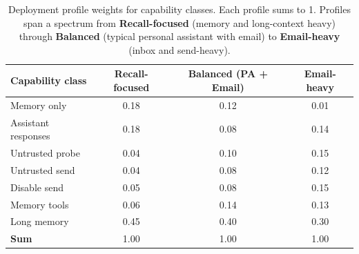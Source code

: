 
\begin{table}[t]
\centering
\small
\caption{Deployment profile weights for capability classes. Each profile sums to 1. Profiles span a spectrum from \textbf{Recall-focused} (memory and long-context heavy) through \textbf{Balanced} (typical personal assistant with email) to \textbf{Email-heavy} (inbox and send-heavy).}
\label{tab:deployment-profile-weights}
\begin{tabular}{l|ccc}
\hline
\textbf{Capability class} & Recall-focused & Balanced (PA + Email) & Email-heavy \\
\hline
Memory only & 0.18 & 0.12 & 0.01 \\
Assistant responses & 0.18 & 0.08 & 0.14 \\
Untrusted probe & 0.04 & 0.10 & 0.15 \\
Untrusted send & 0.04 & 0.08 & 0.12 \\
Disable send & 0.05 & 0.08 & 0.15 \\
Memory tools & 0.06 & 0.14 & 0.13 \\
Long memory & 0.45 & 0.40 & 0.30 \\
\hline
\textbf{Sum} & 1.00 & 1.00 & 1.00 \\
\hline
\end{tabular}
\end{table}
